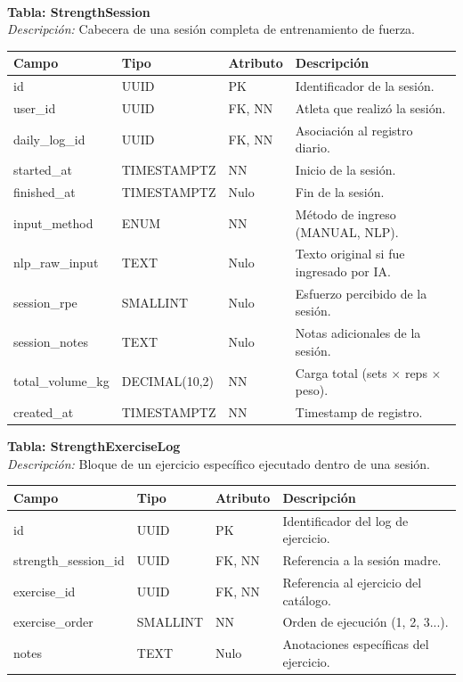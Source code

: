 \documentclass[12pt]{article}
\begin{document}
\\
\noindent\textbf{Tabla: StrengthSession} \\
\textit{Descripción:} Cabecera de una sesión completa de entrenamiento de fuerza.
\begin{table}[h!]
    \centering
    \renewcommand{\arraystretch}{1.2}
    \small
    \begin{tabular}{|p{3.5cm}|p{2.7cm}|p{2cm}|p{6.5cm}|}
        \hline
        \rowcolor[HTML]{EFEFEF}
        \textbf{Campo} & \textbf{Tipo} & \textbf{Atributo} & \textbf{Descripción} \\ \hline
        id & UUID & PK & Identificador de la sesión. \\ \hline
        user\_id & UUID & FK, NN & Atleta que realizó la sesión. \\ \hline
        daily\_log\_id & UUID & FK, NN & Asociación al registro diario. \\ \hline
        started\_at & TIMESTAMPTZ & NN & Inicio de la sesión. \\ \hline
        finished\_at & TIMESTAMPTZ & Nulo & Fin de la sesión. \\ \hline
        input\_method & ENUM & NN & Método de ingreso (MANUAL, NLP). \\ \hline
        nlp\_raw\_input & TEXT & Nulo & Texto original si fue ingresado por IA. \\ \hline
        session\_rpe & SMALLINT & Nulo & Esfuerzo percibido de la sesión. \\ \hline
        session\_notes & TEXT & Nulo & Notas adicionales de la sesión. \\ \hline
        total\_volume\_kg & DECIMAL(10,2) & NN & Carga total (sets $\times$ reps $\times$ peso). \\ \hline
        created\_at & TIMESTAMPTZ & NN & Timestamp de registro. \\ \hline
    \end{tabular}
\end{table}
\newpage
\noindent\textbf{Tabla: StrengthExerciseLog} \\
\textit{Descripción:} Bloque de un ejercicio específico ejecutado dentro de una sesión.
\begin{table}[h!]
    \centering
    \renewcommand{\arraystretch}{1.2}
    \small
    \begin{tabular}{|p{3.5cm}|p{2.7cm}|p{2cm}|p{6.5cm}|}
        \hline
        \rowcolor[HTML]{EFEFEF}
        \textbf{Campo} & \textbf{Tipo} & \textbf{Atributo} & \textbf{Descripción} \\ \hline
        id & UUID & PK & Identificador del log de ejercicio. \\ \hline
        strength\_session\_id & UUID & FK, NN & Referencia a la sesión madre. \\ \hline
        exercise\_id & UUID & FK, NN & Referencia al ejercicio del catálogo. \\ \hline
        exercise\_order & SMALLINT & NN & Orden de ejecución (1, 2, 3...). \\ \hline
        notes & TEXT & Nulo & Anotaciones específicas del ejercicio. \\ \hline
    \end{tabular}
\end{table}
\end{document}
